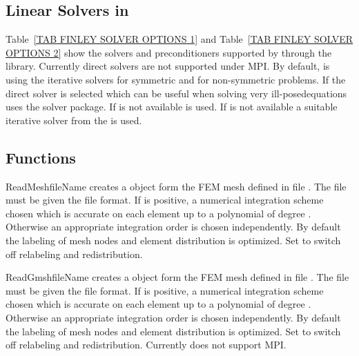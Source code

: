 \subsection{Linear Solvers in \SolverOptions}
Table~\ref{TAB FINLEY SOLVER OPTIONS 1} and
Table~\ref{TAB FINLEY SOLVER OPTIONS 2} show the solvers and preconditioners supported by 
\finley through the \PASO library. Currently direct solvers are not supported under MPI. 
By default, \finley is using the iterative solvers \PCG for symmetric and \BiCGStab for non-symmetric problems. 
If the direct solver is selected which can be useful when solving very ill-posedequations
\finley uses the \MKL solver package. If \MKL is not available \UMFPACK is used. If \UMFPACK is not available 
a suitable iterative solver from the \PASO is used.

\subsection{Functions}
\begin{funcdesc}{ReadMesh}{fileName }
creates a \Domain object form the FEM mesh defined in 
file . The file must be given the \finley file format.
If  is positive, a numerical integration scheme
chosen which is accurate on each element up to a polynomial of
degree  . Otherwise
an appropriate integration order is chosen independently. 
By default the labeling of mesh nodes and element distribution is 
optimized. Set  to switch off relabeling and redistribution.
\end{funcdesc}

\begin{funcdesc}{ReadGmsh}{fileName }
creates a \Domain object form the FEM mesh defined in 
file . The file must be given the \gmshextern file format.
If  is positive, a numerical integration scheme
chosen which is accurate on each element up to a polynomial of
degree  . Otherwise
an appropriate integration order is chosen independently.
By default the labeling of mesh nodes and element distribution is 
optimized. Set  to switch off relabeling and redistribution. 
Currently  does not support MPI.  
\end{funcdesc}


